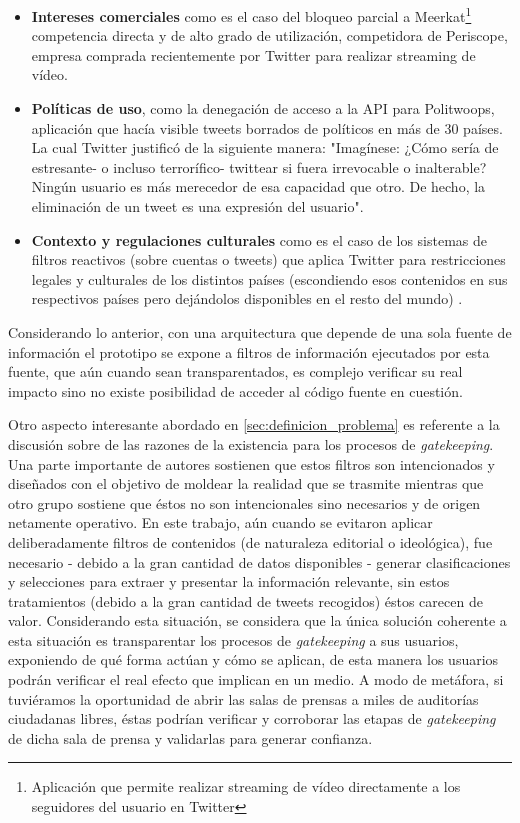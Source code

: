 \begin{itemize}
	\item \textbf{Intereses comerciales} como es el caso del bloqueo parcial a 
		Meerkat\footnote{Aplicación que permite realizar streaming de vídeo directamente a los seguidores del usuario en Twitter} competencia directa y de alto grado de utilización, competidora de Periscope, empresa comprada recientemente por Twitter para realizar streaming de vídeo. 
	\item \textbf{Políticas de uso}, como la denegación de acceso a la API para 
		Politwoops\cite{Diplotwoops:Online}, aplicación que hacía visible tweets borrados de políticos en más de 30 países. La cual Twitter justificó de la siguiente manera: "Imagínese: ¿Cómo sería de estresante- o incluso terrorífico-  twittear si fuera irrevocable o inalterable? Ningún usuario es más merecedor de esa capacidad que otro. De hecho, la eliminación de un tweet es una expresión del usuario".
	\item \textbf{Contexto y regulaciones culturales} como es el caso de los sistemas de filtros reactivos (sobre cuentas o tweets) que aplica Twitter para restricciones legales y culturales de los distintos países (escondiendo esos contenidos en sus respectivos países pero dejándolos disponibles en el resto del mundo) \cite{tweetsStillMustFlow}.
\end{itemize}

Considerando lo anterior, con una arquitectura que depende de una sola fuente de información el prototipo se expone a filtros de información ejecutados por esta fuente, que aún cuando sean transparentados, es complejo verificar su real impacto sino no existe posibilidad de acceder al código fuente en cuestión. 

Otro aspecto interesante abordado en \ref{sec:definicion_problema} es referente a la discusión sobre de las razones de la existencia para los procesos de \emph{gatekeeping}. Una parte importante de autores sostienen que estos filtros son intencionados y diseñados con el objetivo de moldear la realidad que se trasmite mientras que otro grupo sostiene que éstos no son intencionales sino necesarios y de origen netamente operativo. En este trabajo, aún cuando se evitaron aplicar deliberadamente filtros de contenidos (de naturaleza editorial o ideológica), fue necesario - debido a la gran cantidad de datos disponibles - generar clasificaciones y selecciones para extraer y presentar la información relevante, sin estos tratamientos (debido a la gran cantidad de tweets recogidos) éstos carecen de valor. Considerando esta situación, se considera que la única solución coherente a esta situación es transparentar los procesos de \emph{gatekeeping} a sus usuarios, exponiendo de qué forma actúan y cómo se aplican, de esta manera los usuarios podrán verificar el real efecto que implican en un medio. A modo de metáfora, si tuviéramos la oportunidad de abrir las salas de prensas a miles de auditorías ciudadanas libres, éstas podrían verificar y corroborar las etapas de \emph{gatekeeping} de dicha sala de prensa y validarlas para generar confianza.

